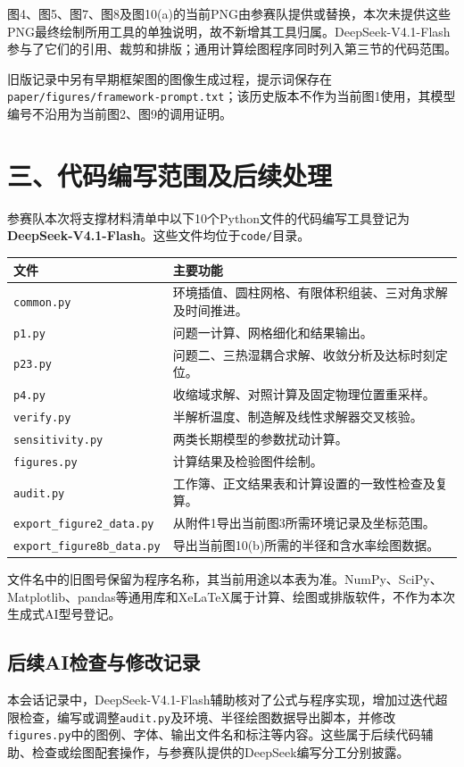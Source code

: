 \documentclass[UTF8,a4paper,zihao=-4]{ctexart}
\begin{document}
图4、图5、图7、图8及图10(a)的当前PNG由参赛队提供或替换，本次未提供这些PNG最终绘制所用工具的单独说明，故不新增其工具归属。DeepSeek-V4.1-Flash参与了它们的引用、裁剪和排版；通用计算绘图程序同时列入第三节的代码范围。

旧版记录中另有早期框架图的图像生成过程，提示词保存在\texttt{paper/figures/}\allowbreak\texttt{framework-prompt.txt}；该历史版本不作为当前图1使用，其模型编号不沿用为当前图2、图9的调用证明。

\clearpage
\section*{三、代码编写范围及后续处理}
参赛队本次将支撑材料清单中以下10个Python文件的代码编写工具登记为\textbf{DeepSeek-V4.1-Flash}。这些文件均位于\texttt{code/}目录。
\par\noindent\begin{tabularx}{\textwidth}{@{}p{}L@{}}
\toprule 文件&主要功能\\\midrule
\texttt{common.py}&环境插值、圆柱网格、有限体积组装、三对角求解及时间推进。\\
\texttt{p1.py}&问题一计算、网格细化和结果输出。\\
\texttt{p23.py}&问题二、三热湿耦合求解、收敛分析及达标时刻定位。\\
\texttt{p4.py}&收缩域求解、对照计算及固定物理位置重采样。\\
\texttt{verify.py}&半解析温度、制造解及线性求解器交叉核验。\\
\texttt{sensitivity.py}&两类长期模型的参数扰动计算。\\
\texttt{figures.py}&计算结果及检验图件绘制。\\
\texttt{audit.py}&工作簿、正文结果表和计算设置的一致性检查及复算。\\
\texttt{export\_figure2\_data.py}&从附件1导出当前图3所需环境记录及坐标范围。\\
\texttt{export\_figure8b\_data.py}&导出当前图10(b)所需的半径和含水率绘图数据。\\
\bottomrule
\end{tabularx}

文件名中的旧图号保留为程序名称，其当前用途以本表为准。NumPy、SciPy、Matplotlib、pandas等通用库和XeLaTeX属于计算、绘图或排版软件，不作为本次生成式AI型号登记。

\subsection*{后续AI检查与修改记录}
本会话记录中，DeepSeek-V4.1-Flash辅助核对了公式与程序实现，增加过迭代超限检查，编写或调整\texttt{audit.py}及环境、半径绘图数据导出脚本，并修改\texttt{figures.py}中的图例、字体、输出文件名和标注等内容。这些属于后续代码辅助、检查或绘图配套操作，与参赛队提供的DeepSeek编写分工分别披露。
\end{document}
